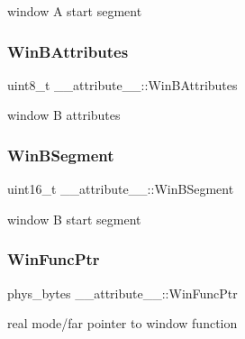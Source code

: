 window A start segment 

\hypertarget{struct____attribute_____ac9e21a3d7d22b24ed82be39f790b1408}{}\label{struct____attribute_____ac9e21a3d7d22b24ed82be39f790b1408} 
\subsubsection{\texorpdfstring{Win\+B\+Attributes}{WinBAttributes}}
{\footnotesize\ttfamily uint8\+\_\+t \+\_\+\+\_\+attribute\+\_\+\+\_\+\+::\+Win\+B\+Attributes}



window B attributes 

\hypertarget{struct____attribute_____a6dbaac9ee1cae36ca0c7b46559264b69}{}\label{struct____attribute_____a6dbaac9ee1cae36ca0c7b46559264b69} 
\subsubsection{\texorpdfstring{Win\+B\+Segment}{WinBSegment}}
{\footnotesize\ttfamily uint16\+\_\+t \+\_\+\+\_\+attribute\+\_\+\+\_\+\+::\+Win\+B\+Segment}



window B start segment 

\hypertarget{struct____attribute_____aa211c2411f48f899b0bb0739ecef0b37}{}\label{struct____attribute_____aa211c2411f48f899b0bb0739ecef0b37} 
\subsubsection{\texorpdfstring{Win\+Func\+Ptr}{WinFuncPtr}}
{\footnotesize\ttfamily phys\+\_\+bytes \+\_\+\+\_\+attribute\+\_\+\+\_\+\+::\+Win\+Func\+Ptr}



real mode/far pointer to window function 

\hypertarget{struct____attribute_____acc2114dbf039909e55cc3966abd3358d}{}\label{struct____attribute_____acc2114dbf039909e55cc3966abd3358d} 

